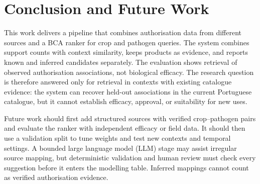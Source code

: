 \section{Conclusion and Future Work}\label{sec:conclusions-and-future-work}

This work delivers a pipeline that combines authorisation data from different sources and a BCA ranker for crop and pathogen queries.
The system combines support counts with context similarity, keeps products as evidence, and reports known and inferred candidates separately.
The evaluation shows retrieval of observed authorisation associations, not biological efficacy.
The research question is therefore answered only for retrieval in contexts with existing catalogue evidence: the system can recover held-out associations in the current Portuguese catalogue, but it cannot establish efficacy, approval, or suitability for new uses.

Future work should first add structured sources with verified crop--pathogen pairs and evaluate the ranker with independent efficacy or field data.
It should then use a validation split to tune weights and test new contexts and temporal settings.
A bounded large language model (LLM) stage may assist irregular source mapping, but deterministic validation and human review must check every suggestion before it enters the modelling table.
Inferred mappings cannot count as verified authorisation evidence.
